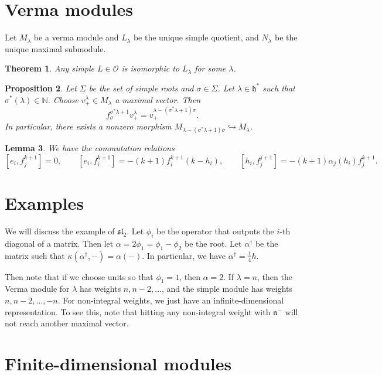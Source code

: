 \documentclass[leqno, openany]{memoir}
\newtheorem{thm}{Theorem}[section]
\newtheorem{prop}[thm]{Proposition}
\newtheorem{lem}[thm]{Lemma}
\theoremstyle{definition}
\theoremstyle{remark}
\theoremstyle{plain}
\theoremstyle{definition}
\theoremstyle{remark}
\newcommand{\N}{\mathbb{N}}
\newcommand{\h}{\mathfrak{h}}
\newcommand{\mc}[1]{\mathcal{#1}}
\newcommand{\mf}[1]{\mathfrak{#1}}
\begin{document}
\section{Verma modules}%
\label{sec:verma_modules}

Let $M_{\lambda}$ be a verma module and $L_{\lambda}$ be the unique simple quotient, and $N_{\lambda}$ be the unique maximal submodule.
\begin{thm}
    Any simple $L \in \mc{O}$ is isomorphic to $L_{\lambda}$ for some $\lambda$.
\end{thm}

\begin{prop}
    Let $\Sigma$ be the set of simple roots and $\sigma \in \Sigma$. Let $\lambda \in \h^*$ such that $\sigma^*(\lambda) \in \N$. Choose $v_+^{\lambda} \in M_{\lambda}$ a maximal vector. Then
    \[ f_{\sigma}^{\sigma^* \lambda + 1} v_+^{\lambda} = v_+^{\lambda - (\sigma^* \lambda + 1) \sigma}. \]
    In particular, there exists a nonzero morphism $M_{\lambda - (\sigma^* \lambda + 1) \sigma} \hookrightarrow M_{\lambda}$.
\end{prop}

\begin{lem}
    We have the commutation relations
    \[ [e_i, f_j^{k+1}] = 0, \qquad [e_i, f_i^{k+1}] = -(k+1) f_i^{k+1} (k - h_i), \qquad [h_i, f_j^{j+1}] = - (k+1) \alpha_j(h_i)f_j^{k+1}. \]
\end{lem}

\section{Examples}%
\label{sec:examples}

We will discuss the example of $\mf{sl}_2$. Let $\phi_i$ be the operator that outputs the $i$-th diagonal of a matrix. Then let $\alpha = 2 \phi_1 = \phi_1 - \phi_2$ be the root. Let $\alpha^{\dag}$ be the matrix such that $\kappa(\alpha^{\dag}, -) = \alpha(-)$. In particular, we have $\alpha^{\dag} = \frac{1}{4} h$.

Then note that if we choose units so that $\phi_1 = 1$, then $\alpha = 2$. If $\lambda = n$, then the Verma module for $\lambda$ has weights $n, n-2, \ldots$, and the simple module has weights $n, n-2, \ldots, -n$. For non-integral weights, we just have an infinite-dimensional representation. To see this, note that hitting any non-integral weight with $\mf{n}^-$ will not reach another maximal vector.

\section{Finite-dimensional modules}%
\label{sec:finite_dimensional_modules}
\end{document}
